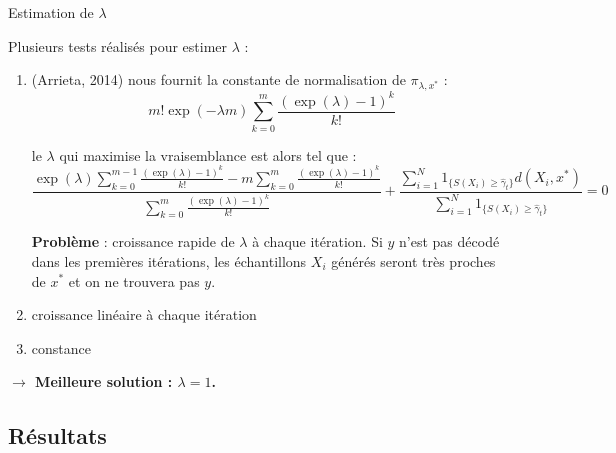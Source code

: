 \documentclass[10pt,xcolor=table,color={dvipsnames,usenames},ignorenonframetext,usepdftitle=false,french]{beamer}
\begin{document}
\begin{frame}{Estimation de \(\lambda\)}
\protect\hypertarget{estimation-de-lambda}{}

Plusieurs tests réalisés pour estimer \(\lambda\) :

\begin{enumerate}
\item (Arrieta, 2014) nous fournit la constante de normalisation de $\pi_{\lambda,x^*}$ :
$$
m!\exp(-\lambda m)\sum_{k=0}^{m}\frac{(\exp(\lambda)-1)^{k}}{k!}
$$

le $\lambda$ qui maximise la vraisemblance est alors tel que :
\footnotesize
$$
\frac{
\exp(\lambda)\sum_{k=0}^{m-1}\frac{(\exp(\lambda)-1)^{k}}{k!} -
m\sum_{k=0}^{m}\frac{(\exp(\lambda)-1)^{k}}{k!}
}{
\sum_{k=0}^{m}\frac{(\exp(\lambda)-1)^{k}}{k!}
} +
\frac{\sum_{i=1}^N 1_{\{S(X_{i})\geq\hat{\gamma}_{t}\}}d(X_i,x^*)}{\sum_{i=1}^N 1_{\{S(X_{i})\geq\hat{\gamma}_{t}\}}} = 0
$$
\normalsize

\textbf{Problème} : croissance rapide de $\lambda$ à chaque itération. Si $y$ n'est pas décodé dans les premières itérations, les échantillons $X_i$ générés seront très proches de $x^*$ et on ne trouvera pas $y$.

\pause 
\item croissance linéaire à chaque itération \pause 

\item constance
\end{enumerate}

\textbf{$\longrightarrow$ Meilleure solution : $\lambda = 1$.}

\end{frame}

\hypertarget{ruxe9sultats-3}{%
\subsection{Résultats}\label{ruxe9sultats-3}}
\end{document}
